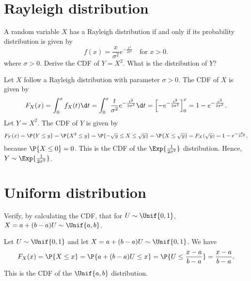 \section{Rayleigh distribution}
\label{sec:section-5.4}
	
	\begin{exercise}
		A random variable $X$ has a Rayleigh distribution if and only if its probability distribution is given by
		\begin{equation}
			f(x) = \frac{x}{\sigma^2} e^{-\frac{x^2}{2 \sigma^2}} \quad \text{for } x > 0.
		\end{equation}
		where $\sigma > 0$. Derive the CDF of $Y = X^2$. What is the distribution of $Y$?
		\begin{solution}
			Let $X$ follow a Rayleigh distribution with parameter $\sigma > 0$. The CDF of $X$ is given by
			\begin{align*}
				F_X(x) = \int_0^x f_X(t) \d t = \int_0^x \frac{t}{\sigma^2} e^{-\frac{t^2}{2 \sigma^2}} \d t = \left[- e^{-\frac{t^2}{2 \sigma^2}}\right]_0^x = 1 - e^{-\frac{x^2}{2 \sigma^2}}.
			\end{align*}
			Let $Y = X^2$. The CDF of $Y$ is given by
			\begin{align*}
				F_Y(x) = \P{Y \leq y} = \P{X^2 \leq y} = \P{-\sqrt{y}\leq X \leq \sqrt{y}}= \P{X \leq \sqrt{y}} = F_X(\sqrt{y}) = 1 - e^{-\frac{y}{2 \sigma^2}},
			\end{align*}
			because $\P{X\leq 0}=0$. This is the CDF of the $\Exp{\frac{1}{2 \sigma^2}}$ distribution. Hence, $Y \sim \Exp{\frac{1}{2 \sigma^2}}$.
		\end{solution}
	\end{exercise}

\section{Uniform distribution}
\label{sec:section-5.5}
	
	\begin{exercise}
		Verify, by calculating the CDF, that for $U \sim \Unif{0,1}$, $X = a + (b - a) U \sim \Unif{a,b}$.
		\begin{solution}
			Let $U \sim \Unif{0,1}$ and let $X = a + (b - a) U \sim \Unif{0,1}$. We have
			\begin{align*}
				F_X(x) = \P{X \leq x} = \P{a + (b - a) U \leq x} = \P{U \leq \frac{x - a}{b - a}} = \frac{x - a}{b - a}.
			\end{align*}
			This is the CDF of the $\Unif{a,b}$ distribution.
		\end{solution}
	\end{exercise}
	
